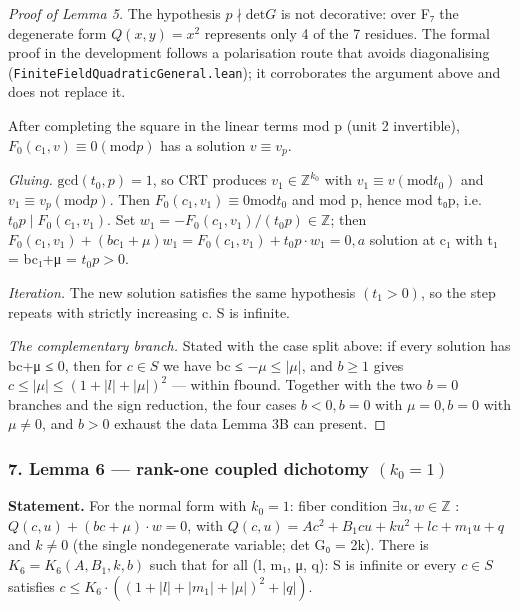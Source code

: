 \documentclass[11pt]{article}
\theoremstyle{plain}
\theoremstyle{definition}
\theoremstyle{remark}
\theoremstyle{plain}
\theoremstyle{definition}
\theoremstyle{remark}
\theoremstyle{plain}
\theoremstyle{definition}
\theoremstyle{remark}
\begin{document}
\begin{proof}[Proof of Lemma 5]
The hypothesis $p ∤ \mathrm{det} G$ is not decorative: over F₇ the degenerate form $Q(x,y) = x^{2}$ represents only 4 of the 7 residues. The formal proof in the development follows a polarisation route that avoids diagonalising (\texttt{FiniteFieldQuadraticGeneral.\allowbreak{}lean}); it corroborates the argument above and does not replace it.

After completing the square in the linear terms mod p (unit 2 invertible), $F_{0}(c_{1}, v) ≡ 0 (\mathrm{mod} p)$ has a solution $v ≡ v_{p}$.

\emph{Gluing.} $\mathrm{gcd}(t_{0}, p) = 1$, so CRT produces $v_{1} ∈ ℤ^{k_{0}}$ with $v_{1} ≡ v (\mathrm{mod} t_{0})$ and $v_{1} ≡ v_{p} (\mathrm{mod} p)$. Then $F_{0}(c_{1}, v_{1}) ≡ 0 \mathrm{mod} t_{0}$ and mod p, hence mod t₀p, i.e. $t_{0}p ∣ F_{0}(c_{1}, v_{1})$. Set $w_{1} = −F_{0}(c_{1}, v_{1})/(t_{0}p) ∈ ℤ$; then $F_{0}(c_{1}, v_{1}) + (bc_{1}+μ)w_{1} = F_{0}(c_{1}, v_{1}) + t_{0}p·w_{1} = 0, a$ solution at c₁ with t₁ = bc₁+μ = $t_{0}p > 0$.

\emph{Iteration.} The new solution satisfies the same hypothesis $(t_{1} > 0)$, so the step repeats with strictly increasing c. S is infinite.

\emph{The complementary branch.} Stated with the case split above: if every solution has bc+μ ≤ 0, then for $c ∈ S$ we have bc ≤ $−μ ≤ |μ|$, and $b ≥ 1$ gives $c ≤ |μ| ≤ (1+|l|+|μ|)^{2}$ — within fbound. Together with the two $b = 0$ branches and the sign reduction, the four cases $b < 0, b = 0$ with $μ = 0, b = 0$ with $μ ≠ 0$, and $b > 0$ exhaust the data Lemma 3B can present.

\end{proof}
\subsubsection*{7. Lemma 6 — rank-one coupled dichotomy $(k_{0} = 1)$}
\textbf{Statement.} For the normal form with $k_{0} = 1$: fiber condition $∃ u, w ∈ ℤ$ : $Q(c,u) + (bc+μ)·w = 0$, with $Q(c,u) = A c^{2} + B_{1} c u + k u^{2} + l c + m_{1} u + q$ and $k ≠ 0$ (the single nondegenerate variable; det G₀ = 2k). There is $K_{6} = K_{6}(A, B_{1}, k, b)$ such that for all (l, m₁, μ, q): S is infinite or every $c ∈ S$ satisfies $c ≤ K_{6}·((1+|l|+|m_{1}|+|μ|)^{2}+|q|)$.
\end{document}
